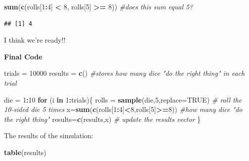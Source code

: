 \documentclass[
]{book}
\newenvironment{Shaded}{\begin{snugshade}}{\end{snugshade}}
\newcommand{\AttributeTok}[1]{\textcolor[rgb]{0.13,0.29,0.53}{#1}}
\newcommand{\CommentTok}[1]{\textcolor[rgb]{0.56,0.35,0.01}{\textit{#1}}}
\newcommand{\ConstantTok}[1]{\textcolor[rgb]{0.56,0.35,0.01}{#1}}
\newcommand{\ControlFlowTok}[1]{\textcolor[rgb]{0.13,0.29,0.53}{\textbf{#1}}}
\newcommand{\DecValTok}[1]{\textcolor[rgb]{0.00,0.00,0.81}{#1}}
\newcommand{\FunctionTok}[1]{\textcolor[rgb]{0.13,0.29,0.53}{\textbf{#1}}}
\newcommand{\NormalTok}[1]{#1}
\newcommand{\OtherTok}[1]{\textcolor[rgb]{0.56,0.35,0.01}{#1}}
\newcommand{\SpecialCharTok}[1]{\textcolor[rgb]{0.81,0.36,0.00}{\textbf{#1}}}
\theoremstyle{definition}
\theoremstyle{definition}
\theoremstyle{definition}
\theoremstyle{definition}
\theoremstyle{remark}
\begin{document}
\begin{Shaded}
\begin{Highlighting}[]
\FunctionTok{sum}\NormalTok{(}\FunctionTok{c}\NormalTok{(rolls[}\DecValTok{1}\SpecialCharTok{:}\DecValTok{4}\NormalTok{] }\SpecialCharTok{\textless{}} \DecValTok{8}\NormalTok{, rolls[}\DecValTok{5}\NormalTok{] }\SpecialCharTok{\textgreater{}=} \DecValTok{8}\NormalTok{)) }\CommentTok{\#does this sum equal 5?}
\end{Highlighting}
\end{Shaded}

\begin{verbatim}
## [1] 4
\end{verbatim}

I think we're ready!!

\textbf{Final Code}

\begin{Shaded}
\begin{Highlighting}[]
\NormalTok{trials }\OtherTok{=} \DecValTok{10000}
\NormalTok{results }\OtherTok{=} \FunctionTok{c}\NormalTok{() }\CommentTok{\#stores how many dice "do the right thing" in each trial}

\NormalTok{die }\OtherTok{=} \DecValTok{1}\SpecialCharTok{:}\DecValTok{10}
\ControlFlowTok{for}\NormalTok{ (i }\ControlFlowTok{in} \DecValTok{1}\SpecialCharTok{:}\NormalTok{trials)\{}
\NormalTok{  rolls }\OtherTok{=} \FunctionTok{sample}\NormalTok{(die,}\DecValTok{5}\NormalTok{,}\AttributeTok{replace=}\ConstantTok{TRUE}\NormalTok{) }\CommentTok{\# roll the 10{-}sided die 5 times}
\NormalTok{  x}\OtherTok{=}\FunctionTok{sum}\NormalTok{(}\FunctionTok{c}\NormalTok{(rolls[}\DecValTok{1}\SpecialCharTok{:}\DecValTok{4}\NormalTok{]}\SpecialCharTok{\textless{}}\DecValTok{8}\NormalTok{,rolls[}\DecValTok{5}\NormalTok{]}\SpecialCharTok{\textgreater{}=}\DecValTok{8}\NormalTok{)) }\CommentTok{\#how many dice "do the right thing"}
\NormalTok{  results}\OtherTok{=}\FunctionTok{c}\NormalTok{(results,x) }\CommentTok{\# update the results vector}
\NormalTok{\}}
\end{Highlighting}
\end{Shaded}

The results of the simulation:

\begin{Shaded}
\begin{Highlighting}[]
\FunctionTok{table}\NormalTok{(results)}
\end{Highlighting}
\end{Shaded}
\end{document}
